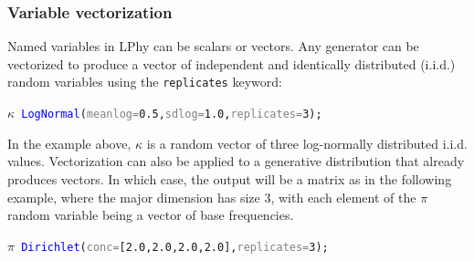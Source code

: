 \documentclass[10pt,letterpaper,table]{article}
\theoremstyle{definition}
\begin{document}



\subsubsection{Variable vectorization}

Named variables in LPhy can be scalars or vectors. Any generator can be vectorized to produce a vector of independent and identically distributed (i.i.d.) random variables using the \texttt{replicates} keyword:

{\small
\begin{alltt}
    \textcolor{bluishgreen}{\(\kappa\)} ~ \textcolor{blue}{LogNormal}(\textcolor{gray}{meanlog=}\textcolor{constant}{0.5}, \textcolor{gray}{sdlog=}\textcolor{constant}{1.0}, \textcolor{gray}{replicates=}\textcolor{constant}{3});
\end{alltt}
}

In the example above, $\kappa$ is a random vector of three log-normally distributed i.i.d. values.
%
Vectorization can also be applied to a generative distribution that already produces vectors. In which case, the output will be a matrix as in the following example, where the major dimension has size 3, with each element of the $\pi$ random variable being a vector of base frequencies.

{\small
\begin{alltt}
      \textcolor{bluishgreen}{\(\pi\)} ~ \textcolor{blue}{Dirichlet}(\textcolor{gray}{conc=}[\textcolor{constant}{2.0}, \textcolor{constant}{2.0}, \textcolor{constant}{2.0}, \textcolor{constant}{2.0}], \textcolor{gray}{replicates=}\textcolor{constant}{3});
\end{alltt}
}
\end{document}
